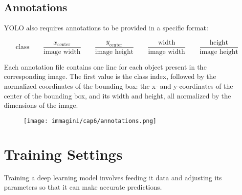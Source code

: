 \subsection*{Annotations}
YOLO also requires annotations to be provided in a specific format:

\begin{equation*}
    \text{class} \qquad \dfrac{x_{\text{center}}}{\text{image width}} \qquad \dfrac{y_{\text{center}}}{\text{image height}} \qquad \dfrac{\text{width}}{\text{image width}} \qquad \dfrac{\text{height}}{\text{image height}}
\end{equation*}

Each annotation file contains one line for each object present in the corresponding image. The first value is the class index, followed by the normalized coordinates of the bounding box: the x- and y-coordinates of the center of the bounding box, and its width and height, all normalized by the dimensions of the image.

\begin{figure}[!ht]
\centering
\texttt{[image: immagini/cap6/annotations.png]}
\label{fig:annotations_cat}
\end{figure}

\section{Training Settings}
Training a deep learning model involves feeding it data and adjusting its parameters so that it can make accurate predictions. 
